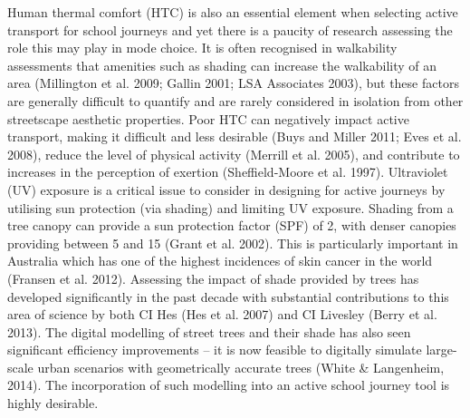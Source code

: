 \documentclass[final,3p,times,authoryear]{elsarticle}
\begin{document}
Human thermal comfort (HTC) is also an essential element when selecting active transport for school journeys and yet
there is a paucity of research assessing the role this may play in mode choice. It is often recognised in walkability
assessments that amenities such as shading can increase the walkability of an area (Millington et al. 2009; Gallin 2001;
LSA Associates 2003), but these factors are generally difficult to quantify and are rarely considered in isolation from
other streetscape aesthetic properties. Poor HTC can negatively impact active transport, making it difficult and less
desirable (Buys and Miller 2011; Eves et al. 2008), reduce the level of physical activity (Merrill et al. 2005), and
contribute to increases in the perception of exertion (Sheffield-Moore et al. 1997).
Ultraviolet (UV) exposure is a critical issue to consider in designing for active journeys by utilising sun protection (via
shading) and limiting UV exposure. Shading from a tree canopy can provide a sun protection factor (SPF) of 2, with
denser canopies providing between 5 and 15 (Grant et al. 2002). This is particularly important in Australia which has
one of the highest incidences of skin cancer in the world (Fransen et al. 2012).
Assessing the impact of shade provided by trees has developed significantly in the past decade with substantial
contributions to this area of science by both CI Hes (Hes et al. 2007) and CI Livesley (Berry et al. 2013). The digital
modelling of street trees and their shade has also seen significant efficiency improvements – it is now feasible to
digitally simulate large-scale urban scenarios with geometrically accurate trees (White \& Langenheim, 2014). The
incorporation of such modelling into an active school journey tool is highly desirable.
\end{document}
